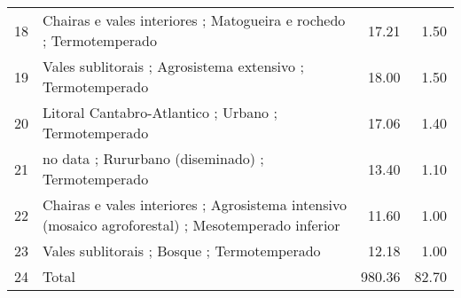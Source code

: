 \begin{table}[p]
\begin{tabular}{rlrr}
  18 & Chairas e vales interiores ; Matogueira e rochedo ; Termotemperado & 17.21 & 1.50 \\ 
  19 & Vales sublitorais ; Agrosistema extensivo ; Termotemperado & 18.00 & 1.50 \\ 
  20 & Litoral Cantabro-Atlantico ; Urbano ; Termotemperado & 17.06 & 1.40 \\ 
  21 & no data ; Rururbano (diseminado) ; Termotemperado & 13.40 & 1.10 \\ 
  22 & Chairas e vales interiores ; Agrosistema intensivo (mosaico agroforestal) ; Mesotemperado inferior & 11.60 & 1.00 \\ 
  23 & Vales sublitorais ; Bosque ; Termotemperado & 12.18 & 1.00 \\ 
  24 & Total & 980.36 & 82.70 \\ 
   \hline
\end{tabular}
\end{table}
